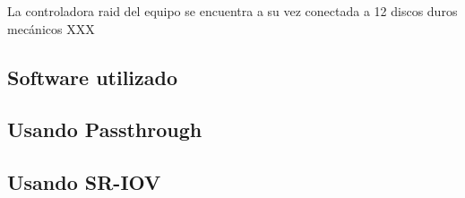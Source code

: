 La controladora raid del equipo se encuentra a su vez conectada a 12 discos duros mecánicos XXX

\subsection{Software utilizado\label{sec:sw}}




\subsection{Usando Passthrough\label{sec:pt}}

\subsection{Usando SR-IOV\label{sec:sriov}}